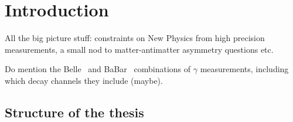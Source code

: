 
\chapter{\label{ch:1-intro}Introduction
} 



All the big picture stuff: constraints on New Physics from high precision measurements, a small nod to matter-antimatter asymmetry questions etc. 

Do mention the Belle~\cite{BelleCombo} and BaBar~\cite{BabarCombo} combinations of $\gamma$ measurements, including which decay channels they include (maybe).

\section{Structure of the thesis} %
\label{sec:structure_of_the_thesis}

